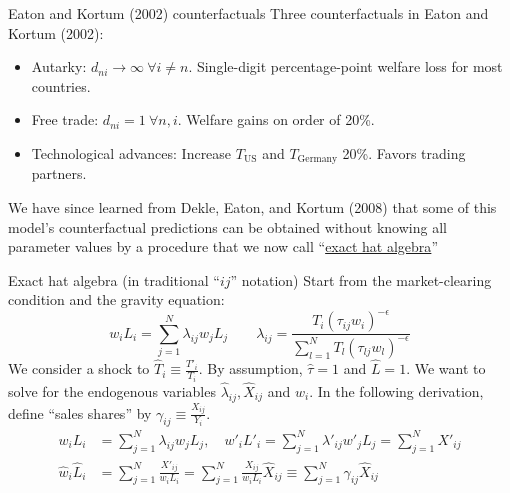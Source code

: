 \documentclass[10pt,notes=hide]{beamer}
\begin{document}
\begin{frame}{Eaton and Kortum (2002) counterfactuals}
Three counterfactuals in Eaton and Kortum (2002):
\begin{itemize}
	\item Autarky: $d_{ni} \to \infty \ \forall i\neq n$. Single-digit percentage-point welfare loss for most countries.
	\item Free trade: $d_{ni}=1 \ \forall n,i$. Welfare gains on order of 20\%.
	\item Technological advances: Increase $T_{\text{US}}$ and  $T_{\text{Germany}}$ 20\%. Favors trading partners.
\end{itemize}
We have since learned from Dekle, Eaton, and Kortum (2008) that some of this model's counterfactual predictions can be obtained without knowing all parameter values by a procedure that we now call ``\href{https://tradediversion.net/2018/05/07/on-hat-algebra/}{exact hat algebra}''
\end{frame}
\begin{frame}{Exact hat algebra (in traditional ``$ij$'' notation)}
Start from the market-clearing condition and the gravity equation:
\begin{equation*}
w_i L_i
=
\sum_{j=1}^{N} \lambda_{ij} w_j L_j 
\quad \quad
\lambda_{ij} 
=
\frac{T_{i} \left(\tau_{ij}w_i\right)^{-\epsilon}}{\sum_{l=1}^{N} T_{l}  \left(\tau_{lj}w_l\right)^{-\epsilon}}
\end{equation*}
We consider a shock to $\hat{T}_{i} \equiv \frac{T'_{i}}{T_{i}}$.
By assumption, $\hat{\tau}=1$ and $\hat{L}=1$.
We want to solve for the endogenous variables $\hat{\lambda}_{ij}, \hat{X}_{ij}$ and $\hat{w}_{i}$.
In the following derivation, 
define ``sales shares'' by
$\gamma_{ij}\equiv\frac{X_{ij}}{Y_{i}}$.
\begin{align}
w_i L_i
&=
\sum_{j=1}^{N} \lambda_{ij} w_j L_j,
\quad
w'_i L'_i
=
\sum_{j=1}^{N} \lambda'_{ij} w'_j L_j
=
\sum_{j=1}^{N} X'_{ij}
\nonumber \\
\hat{w}_i \hat{L}_i
&= 
\sum_{j=1}^{N} \frac{X'_{ij}}{w_i L_i}
=
\sum_{j=1}^{N} \frac{X_{ij}}{w_i L_i} \hat{X}_{ij}
\equiv
\sum_{j=1}^{N} \gamma_{ij} \hat{X}_{ij}  \label{eqn:20180428:1sector:hatincome}
\end{align}
\end{frame}
\end{document}
